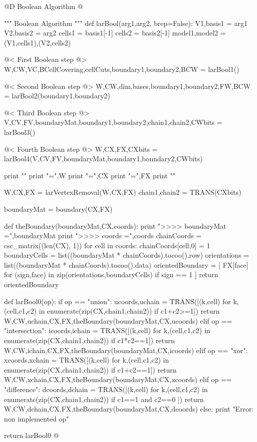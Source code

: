 \documentclass[11pt,oneside]{article}	%
\begin{document}
@D Boolean Algorithm
@{""" Boolean Algorithm """
def larBool(arg1,arg2, brep=False):
	V1,basis1 = arg1
	V2,basis2 = arg2
	cells1 = basis1[-1]
	cells2 = basis2[-1]
	model1,model2 = (V1,cells1),(V2,cells2)
		
	@< First Boolean step @>
	W,CW,VC,BCellCovering,cellCuts,boundary1,boundary2,BCW = larBool1()
	
	@< Second Boolean step @>
	W,CW,dim,bases,boundary1,boundary2,FW,BCW = larBool2(boundary1,boundary2)

	@< Third Boolean step @>
	V,CV,FV,boundaryMat,boundary1,boundary2,chain1,chain2,CWbits = larBool3()

	@< Fourth Boolean step @>
	W,CX,FX,CXbits = larBool4(V,CV,FV,boundaryMat,boundary1,boundary2,CWbits)
			
	print "\n"
	print "\nW =",W
	print "\nCX =",CX
	print "\nFX =",FX
	print "\n"
	
	W,CX,FX = larVertexRemoval(W,CX,FX)
	chain1,chain2 = TRANS(CXbits)
	
	boundaryMat = boundary(CX,FX)

	def theBoundary(boundaryMat,CX,coords):
		print "\n>>>> boundaryMat =",boundaryMat
		print "\n>>>> coords =",coords
		chainCoords = csc_matrix((len(CX), 1))
		for cell in coords: chainCoords[cell,0] = 1
		boundaryCells = list((boundaryMat * chainCoords).tocoo().row)
		orientations = list((boundaryMat * chainCoords).tocoo().data)
		orientedBoundary = [ FX[face] for (sign,face) in zip(orientations,boundaryCells)  if sign == 1 ]
		return orientedBoundary


	def larBool0(op):	
		if op == "union": 
			ucoords,uchain = TRANS([(k,cell) for k,(cell,c1,c2) in enumerate(zip(CX,chain1,chain2)) if c1+c2>=1])
			return W,CW,uchain,CX,FX,theBoundary(boundaryMat,CX,ucoords)
		elif op == "intersection": 
			icoords,ichain = TRANS([(k,cell) for k,(cell,c1,c2) in enumerate(zip(CX,chain1,chain2)) if c1*c2==1])
			return W,CW,ichain,CX,FX,theBoundary(boundaryMat,CX,icoords)
		elif op == "xor": 
			xcoords,xchain = TRANS([(k,cell) for k,(cell,c1,c2) in enumerate(zip(CX,chain1,chain2)) if c1+c2==1])
			return W,CW,xchain,CX,FX,theBoundary(boundaryMat,CX,xcoords)
		elif op == "difference": 
			dcoords,dchain = TRANS([(k,cell) for k,(cell,c1,c2) in enumerate(zip(CX,chain1,chain2)) if c1==1 and c2==0 ])
			return W,CW,dchain,CX,FX,theBoundary(boundaryMat,CX,dcoords)
		else: print "Error: non implemented op"

	return larBool0
@}
\end{document}
